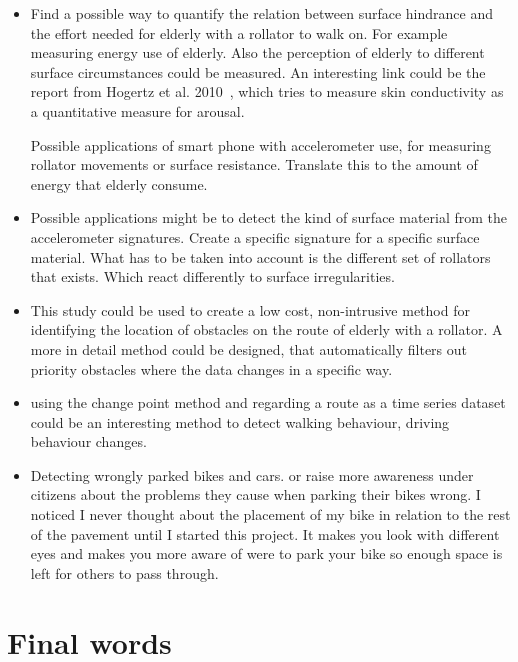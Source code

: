 \begin{itemize}
\item Find a possible way to quantify the relation between surface hindrance and the effort needed for elderly with a rollator to walk on. For example measuring energy use of elderly. Also the perception of elderly to different surface circumstances could be measured. An interesting link could be the report from Hogertz et al. 2010~\cite{Sauter2010}, which tries to measure skin conductivity as a quantitative measure for arousal. 

Possible applications of smart phone with accelerometer use, for measuring rollator movements or surface resistance. Translate this to the amount of energy that elderly consume. 

\item
Possible applications might be to detect the kind of surface material from the accelerometer signatures. Create a specific signature for a specific surface material. What has to be taken into account is the different set of rollators that exists. Which react differently to surface irregularities.


\item This study could be used to create a low cost, non-intrusive method for identifying the location of obstacles on the route of elderly with a rollator. A more in detail method could be designed, that automatically filters out priority obstacles where the data changes in a specific way. 

\item using the change point method and regarding a route as a time series dataset could be an interesting method to detect walking behaviour, driving behaviour changes. 

\item Detecting wrongly parked bikes and cars. or raise more awareness under citizens about the problems they cause when parking their bikes wrong. I noticed I never thought about the placement of my bike in relation to the rest of the pavement until I started this project. It makes you look with different eyes and makes you more aware of were to park your bike so enough space is left for others to pass through.  

\end{itemize}






\section{Final words}


